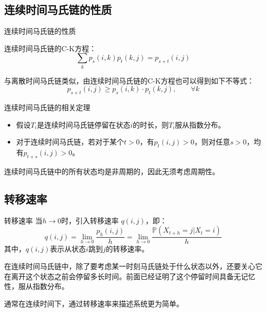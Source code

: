 \documentclass[t]{beamer}
\renewcommand{\Pr}{\mathbb{P}}
\begin{document}
\subsection{连续时间马氏链的性质}
\begin{frame}{连续时间马氏链的性质}
  \begin{block}{连续时间马氏链的C-K方程：}
    \[\sum_k p_s(i,k)p_t(k,j)=p_{s+t}(i,j) \]
  \end{block}
  \begin{center}
      \end{center}

  与离散时间马氏链类似，由连续时间马氏链的C-K方程也可以得到如下不等式：
  \begin{equation*}
  p_{s+t}(i,j)\ge p_s(i,k)\cdot p_t(k,j), \qquad \forall k
  \end{equation*}

\end{frame}

\begin{frame}{连续时间马氏链的相关定理}
\begin{itemize}
  \item 假设$T_i$是连续时间马氏链停留在状态$i$的时长，则$T_i$服从指数分布。
  \item 对于连续时间马氏链，若对于某个$t>0$，有$p_t(i,j)>0$，则对任意$s>0$，均有$p_{t+s}(i,j)>0$。
\end{itemize}
    
连续时间马氏链中的所有状态均是非周期的，因此无须考虑周期性。
\end{frame}

\subsection{转移速率}
\begin{frame}{转移速率}
  当${h}\to 0$时，引入{转移速率} $q(i,j)$，即：
  \[q(i,j)=\lim_{h\to 0}\frac{p_{h}(i,j)}{h}=\lim_{h\to 0}\frac{\Pr(X_{t+{h}}=j|X_t=i)}{h} \]
  其中，$q(i,j)$表示从状态$i$跳到$j$的转移速率。

  在连续时间马氏链中，除了要考虑某一时刻马氏链处于{什么状态}以外，还要关心它在离开这个状态之前会停留{多长时间}。前面已经证明了这个停留时间具备无记忆性，服从{指数分布}。

通常在连续时间下，通过转移速率来描述系统更为简单。 
\end{frame}
\end{document}
